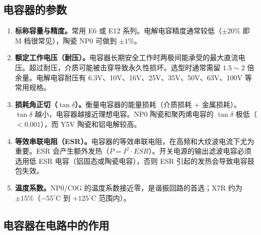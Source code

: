 \documentclass[12pt,UTF8]{ctexbook}
\begin{document}
\subsection{电容器的参数}

\begin{enumerate}
\item \textbf{标称容量与精度。}常用 E6 或 E12 系列。电解电容精度通常较低（$\pm20\%$ 即 M 档很常见），陶瓷 NP0 可做到 $\pm1\%$。

\item \textbf{额定工作电压（耐压）。}电容器长期安全工作时两极间能承受的最大直流电压。超过耐压，介质可能被击穿导致永久性损坏。选型时通常需留 $1.5\sim2$ 倍余量。电解电容耐压有 6.3V、10V、16V、25V、35V、50V、63V、100V 等常用规格。

\item \textbf{损耗角正切（$\tan\delta$）。}衡量电容器的能量损耗（介质损耗 + 金属损耗）。$\tan\delta$ 越小，电容器越接近理想电容。NP0 陶瓷和聚丙烯电容的 $\tan\delta$ 极低（$<0.001$），而 Y5V 陶瓷和铝电解较高。

\item \textbf{等效串联电阻（ESR）。}电容器的等效串联电阻，在高频和大纹波电流下尤为重要。ESR 会产生额外发热（$P = I^2 \cdot ESR$）。开关电源的输出滤波电容必须选用低 ESR 电容（铝固态或陶瓷电容），否则 ESR 引起的发热会导致电容鼓包失效。

\item \textbf{温度系数。}NP0/C0G 的温度系数接近零，是谐振回路的首选；X7R 约为 $\pm15\%$（$-55^\circ \mathrm{C}$ 到 $+125^\circ \mathrm{C}$ 范围内）。
\end{enumerate}

\subsection{电容器在电路中的作用}
\end{document}
